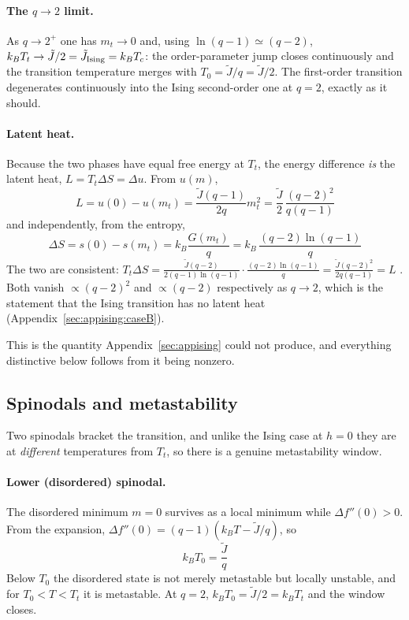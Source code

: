 \documentclass[10pt,a4paper]{article}
\theoremstyle{remark}
\begin{document}
\paragraph{The $q\to2$ limit.} As $q\to2^{+}$ one has $m_t\to0$ and, using
$\ln(q-1)\simeq(q-2)$, $k_BT_t\to\tilde J/2=\tilde J_{\rm Ising}=k_BT_c$: the
order-parameter jump closes continuously and the transition temperature merges
with $T_0=\tilde J/q=\tilde J/2$. The first-order transition degenerates
continuously into the Ising second-order one at $q=2$, exactly as it should.

\paragraph{Latent heat.} Because the two phases have equal free energy at $T_t$,
the energy difference \emph{is} the latent heat, $L=T_t\Delta S=\Delta u$. From
$u(m)$,
\[
\;
L=u(0)-u(m_t)=\frac{\tilde J(q-1)}{2q}m_t^{2}
=\frac{\tilde J}{2}\,\frac{(q-2)^{2}}{q(q-1)}\
\]
and independently, from the entropy,
\[
\;
\Delta S=s(0)-s(m_t)=k_B\frac{G(m_t)}{q}=k_B\,\frac{(q-2)\ln(q-1)}{q}\
\]
The two are consistent: $T_t\Delta S = \frac{\tilde J(q-2)}{2(q-1)\ln(q-1)}\cdot
\frac{(q-2)\ln(q-1)}{q}=\frac{\tilde J(q-2)^{2}}{2q(q-1)}=L$ \checkmark. Both
vanish $\propto(q-2)^{2}$ and $\propto(q-2)$ respectively as $q\to2$, which is the
statement that the Ising transition has no latent heat
(Appendix~\ref{sec:appising:caseB}).

This is the quantity Appendix~\ref{sec:appising} could not produce, and everything
distinctive below follows from it being nonzero.

\subsection{Spinodals and metastability}
\label{sec:apppotts:spinodal}

Two spinodals bracket the transition, and unlike the Ising case at $h=0$ they are
at \emph{different} temperatures from $T_t$, so there is a genuine metastability
window.

\paragraph{Lower (disordered) spinodal.} The disordered minimum $m=0$ survives as
a local minimum while $\Delta f''(0)>0$. From the expansion,
$\Delta f''(0)=(q-1)(k_BT-\tilde J/q)$, so
\[
\;k_BT_0=\frac{\tilde J}{q}\
\]
Below $T_0$ the disordered state is not merely metastable but locally unstable, and
for $T_0<T<T_t$ it is metastable. At $q=2$, $k_BT_0=\tilde J/2=k_BT_t$ and the
window closes.
\end{document}
